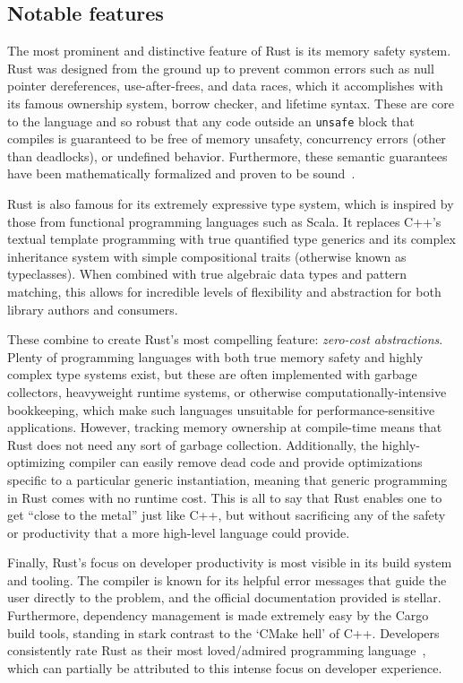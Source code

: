 \subsection{Notable features}
The most prominent and distinctive feature of Rust is its memory safety system.
Rust was designed from the ground up to prevent common errors such as null pointer dereferences, use-after-frees, and data races,
which it accomplishes with its famous ownership system, borrow checker, and lifetime syntax.
These are core to the language and so robust that any code outside an \texttt{unsafe} block that compiles
is guaranteed to be free of memory unsafety, concurrency errors (other than deadlocks), or undefined behavior.
Furthermore, these semantic guarantees have been mathematically formalized and proven to be sound~\cite{rustbelt}.

Rust is also famous for its extremely expressive type system, which is inspired by those from functional programming languages such as Scala.
It replaces C++'s textual template programming with true quantified type generics and its complex inheritance system with simple
compositional traits (otherwise known as typeclasses).
When combined with true algebraic data types and pattern matching, this allows for incredible levels of flexibility and abstraction
for both library authors and consumers.

These combine to create Rust's most compelling feature: \textit{zero-cost abstractions}.
Plenty of programming languages with both true memory safety and highly complex type systems exist, but these are often implemented with
garbage collectors, heavyweight runtime systems, or otherwise computationally-intensive bookkeeping, which make such languages unsuitable
for performance-sensitive applications.
However, tracking memory ownership at compile-time means that Rust does not need any sort of garbage collection.
Additionally, the highly-optimizing compiler can easily remove dead code and provide optimizations specific to a particular generic instantiation,
meaning that generic programming in Rust comes with no runtime cost.
This is all to say that Rust enables one to get ``close to the metal'' just like C++,
but without sacrificing any of the safety or productivity that a more high-level language could provide.

Finally, Rust's focus on developer productivity is most visible in its build system and tooling.
The compiler is known for its helpful error messages that guide the user directly to the problem, and the official documentation provided is stellar.
Furthermore, dependency management is made extremely easy by the Cargo build tools,
standing in stark contrast to the `CMake hell' of C++.
Developers consistently rate Rust as their most loved/admired programming language~\cite{sosurvey},
which can partially be attributed to this intense focus on developer experience.

